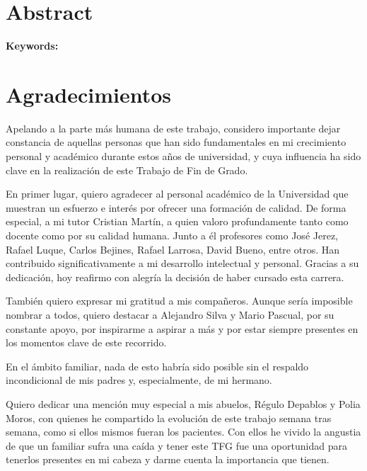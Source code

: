 \documentclass[12pt, a4paper]{article}
\begin{document}





\begin{abstract}
    

	{\bfseries\large Palabras clave:} 

\end{abstract}

\section*{Abstract}

	
	
	{\bfseries\large Keywords:} 

\clearpage
\section*{Agradecimientos}

Apelando a la parte más humana de este trabajo, considero importante dejar constancia de aquellas personas que han sido fundamentales en mi crecimiento personal y acad\'emico durante estos a\~nos de universidad, y cuya influencia ha sido clave en la realizaci\'on de este Trabajo de Fin de Grado.

En primer lugar, quiero agradecer al personal acad\'emico de la Universidad que muestran un esfuerzo e interés por ofrecer una formaci\'on de calidad. De forma especial, a mi tutor Cristian Mart\'in, a quien valoro profundamente tanto como docente como por su calidad humana. Junto a \'el profesores como Jos\'e Jerez, Rafael Luque, Carlos Bejines, Rafael Larrosa, David Bueno, entre otros. Han contribuido significativamente a mi desarrollo intelectual y personal. Gracias a su dedicaci\'on, hoy reafirmo con alegría la decisi\'on de haber cursado esta carrera.

Tambi\'en quiero expresar mi gratitud a mis compa\~neros. Aunque ser\'ia imposible nombrar a todos, quiero destacar a Alejandro Silva y Mario Pascual, por su constante apoyo, por inspirarme a aspirar a más y por estar siempre presentes en los momentos clave de este recorrido.

En el \'ambito familiar, nada de esto habr\'ia sido posible sin el respaldo incondicional de mis padres y, especialmente, de mi hermano.

Quiero dedicar una menci\'on muy especial a mis abuelos, R\'egulo Depablos y Polia Moros, con quienes he compartido la evoluci\'on de este trabajo semana tras semana, como si ellos mismos fueran los pacientes. Con ellos he vivido la angustia de que un familiar sufra una caída y tener este TFG fue una oportunidad para tenerlos presentes en mi cabeza y darme cuenta la importancia que tienen.
\end{document}
